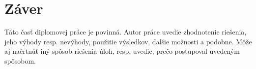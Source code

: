 \chapter{Záver}

Táto časť diplomovej práce je povinná. Autor práce uvedie zhodnotenie riešenia, jeho výhody resp. nevýhody, použitie výsledkov, ďalšie možnosti a podobne.  Môže aj načrtnúť iný spôsob riešenia úloh, resp. uvedie, prečo postupoval uvedeným spôsobom.
